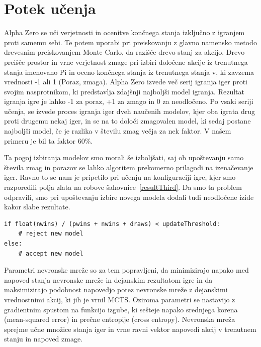 \documentclass[a4paper, 12pt]{book}
\begin{document}
\section{Potek učenja}
\label{potekUcenja}
Alpha Zero se uči verjetnosti in ocenitve končnega stanja izključno z igranjem proti samemu sebi. 
Te potem uporabi pri preiskovanju z glavno namensko metodo drevesnim preiskovanjem Monte Carlo, da razišče drevo stanj za akcijo.
Drevo preišče prostor in vrne verjetnost zmage pri izbiri določene akcije iz trenutnega stanja imenovano Pi in oceno končnega stanja iz trenutnega stanja v, ki zavzema vrednosti -1 ali 1 (Poraz, zmaga).
Alpha Zero izvede več serij igranja iger proti svojim nasprotnikom, ki predstavlja zdajšnji najboljši model igranja.
Rezultat igranja igre je lahko -1 za poraz, +1 za zmago in 0 za neodločeno.
Po vsaki seriji učenja, se izvede proces igranja iger dveh naučenih modelov, kjer oba igrata drug proti drugemu nekaj iger, in se na to določi zmagovalen model, ki sedaj postane najboljši model, če je razlika v številu zmag večja za nek faktor. V našem primeru je bil ta faktor 60\%.

Ta pogoj izbiranja modelov smo morali še izboljšati, saj ob upoštevanju samo števila zmag in porazov se lahko algoritem prekomerno prilagodi na izenačevanje iger.
Ravno to se nam je pripetilo pri učenju na konfiguraciji igre, kjer smo razporedili polja zlata na robove šahovnice~\ref{resultThird}.
Da smo ta problem odpravili, smo pri upoštevanju izbire novega modela dodali tudi neodločene izide kakor slabe rezultate.
\begin{verbatim}
if float(nwins) / (pwins + nwins + draws) < updateThreshold:
    # reject new model
else:
    # accept new model
\end{verbatim}

Parametri nevronske mreže so za tem popravljeni, da minimizirajo napako med napoved stanja nevronske mreže in dejanskim rezultatom igre in da maksimizirajo podobnost napovedjo potez nevronske mreže z dejanskimi vrednostnimi akcij, ki jih je vrnil MCTS. 
Oziroma parametri se nastavijo z gradientnim spustom na funkcijo izgube, ki sešteje napako srednjega korena (mean-squared error) in prečne entropije (cross entropy).
Nevronska mreža sprejme učne množice stanja iger in vrne ravni vektor napovedi akcij v trenutnem stanju in napoved zmage.
\end{document}
